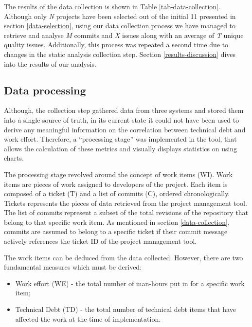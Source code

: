 \documentclass{mpaper}
\begin{document}
The results of the data collection is shown in Table \ref{tab-data-collection}.
Although only \emph{N} projects have been selected out of the initial 11
presented in section \ref{data-selection}, using our data collection process we
have managed to retrieve and analyse \emph{M} commits and \emph{X} issues along
with an average of \emph{T} unique quality issues. Additionally, this process
was repeated a second time due to changes in the static analysis collection
step. Section \ref{results-discussion} dives into the results of our analysis. 

\subsection{Data processing}
\label{data-processing}

Although, the collection step gathered data from three systems and stored them
into a single source of truth, in its current state it could not have been used
to derive any meaningful information on the correlation between technical debt
and work effort. Therefore, a ``processing stage'' was implemented in the tool,
that allows the calculation of these metrics and visually displays statistics on
using charts.

The processing stage revolved around the concept of work items (WI). Work items
are pieces of work assigned to developers of the project. Each item is composed
of a ticket (T) and a list of commits (C), ordered chronologically. Tickets
represents the pieces of data retrieved from the project management tool. The
list of commits represent a subset of the total revisions of the repository that
belong to that specific work item. As mentioned in section
\ref{data-collection}, commits are assumed to belong to a specific ticket if
their commit message actively references the ticket ID of the project management
tool.

The work items can be deduced from the data collected. However, there are two
fundamental measures which must be derived:
\begin{itemize}
  \item Work effort (WE) - the total number of man-hours put in for a specific
  work item;
  \item Technical Debt (TD) - the total number of technical debt items that have
  affected the work at the time of implementation.
\end{itemize}
\end{document}
